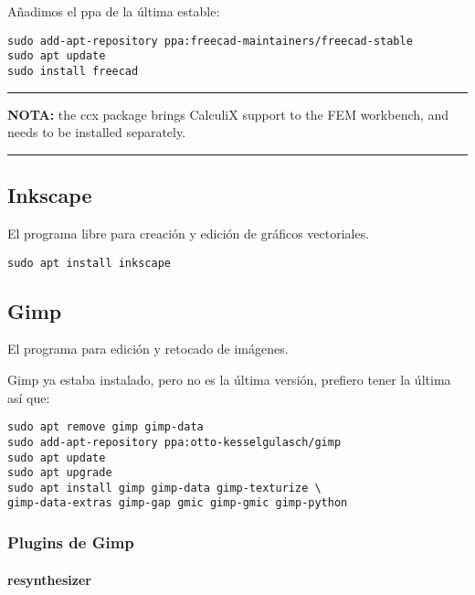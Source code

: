 \documentclass[
  12pt,
  spanish,
]{article}
\begin{document}
Añadimos el ppa de la última estable:

\begin{verbatim}
sudo add-apt-repository ppa:freecad-maintainers/freecad-stable
sudo apt update
sudo install freecad
\end{verbatim}

\begin{center}\rule{0.5\linewidth}{\linethickness}\end{center}

\textbf{NOTA:} the ccx package brings CalculiX support to the FEM
workbench, and needs to be installed separately.

\begin{center}\rule{0.5\linewidth}{\linethickness}\end{center}

\hypertarget{inkscape}{%
\subsection{Inkscape}\label{inkscape}}

El programa libre para creación y edición de gráficos vectoriales.

\begin{verbatim}
sudo apt install inkscape
\end{verbatim}

\hypertarget{gimp}{%
\subsection{Gimp}\label{gimp}}

El programa para edición y retocado de imágenes.

Gimp ya estaba instalado, pero no es la última versión, prefiero tener
la última así que:

\begin{verbatim}
sudo apt remove gimp gimp-data
sudo add-apt-repository ppa:otto-kesselgulasch/gimp
sudo apt update
sudo apt upgrade
sudo apt install gimp gimp-data gimp-texturize \
gimp-data-extras gimp-gap gmic gimp-gmic gimp-python
\end{verbatim}

\hypertarget{plugins-de-gimp}{%
\subsubsection{Plugins de Gimp}\label{plugins-de-gimp}}

\hypertarget{resynthesizer}{%
\paragraph{resynthesizer}\label{resynthesizer}}
\end{document}
